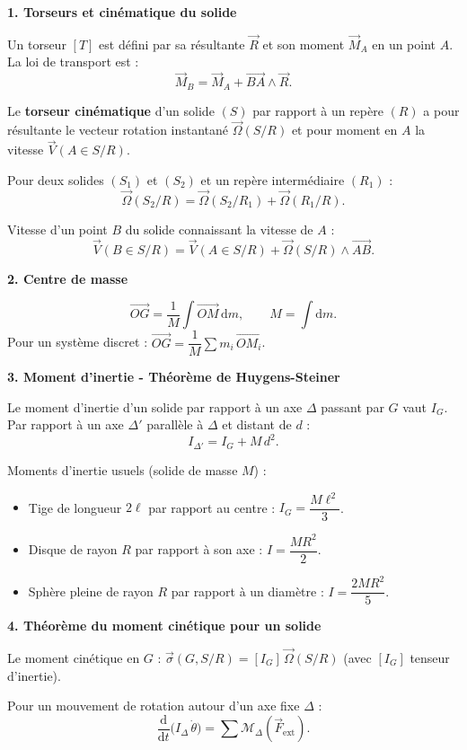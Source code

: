 \documentclass[12pt,a4paper]{article}
\begin{document}
\begin{boiteresume}
\textbf{1. Torseurs et cinématique du solide}

Un torseur $[T]$ est défini par sa résultante $\vec{R}$ et son moment $\vec{M}_A$ en un point $A$. La loi de transport est :
\[
\vec{M}_B = \vec{M}_A + \overrightarrow{BA} \wedge \vec{R}.
\]

Le \textbf{torseur cinématique} d'un solide $(S)$ par rapport à un repère $(R)$ a pour résultante le vecteur rotation instantané $\vec{\Omega}(S/R)$ et pour moment en $A$ la vitesse $\vec{V}(A \in S/R)$.

Pour deux solides $(S_1)$ et $(S_2)$ et un repère intermédiaire $(R_1)$ :
\[
\vec{\Omega}(S_2/R) = \vec{\Omega}(S_2/R_1) + \vec{\Omega}(R_1/R).
\]

Vitesse d'un point $B$ du solide connaissant la vitesse de $A$ :
\[
\vec{V}(B \in S/R) = \vec{V}(A \in S/R) + \vec{\Omega}(S/R) \wedge \overrightarrow{AB}.
\]

\medskip
\textbf{2. Centre de masse}

\[
\overrightarrow{OG} = \frac{1}{M}\int \overrightarrow{OM}\,\mathrm{d}m, \qquad M = \int \mathrm{d}m.
\]
Pour un système discret : $\overrightarrow{OG} = \dfrac{1}{M}\sum m_i\,\overrightarrow{OM_i}$.

\medskip
\textbf{3. Moment d'inertie - Théorème de Huygens-Steiner}

Le moment d'inertie d'un solide par rapport à un axe $\Delta$ passant par $G$ vaut $I_G$. Par rapport à un axe $\Delta'$ parallèle à $\Delta$ et distant de $d$ :
\[
I_{\Delta'} = I_G + M\,d^2.
\]

Moments d'inertie usuels (solide de masse $M$) :
\begin{itemize}
  \item Tige de longueur $2\ell$ par rapport au centre : $I_G = \dfrac{M\ell^2}{3}$.
  \item Disque de rayon $R$ par rapport à son axe : $I = \dfrac{MR^2}{2}$.
  \item Sphère pleine de rayon $R$ par rapport à un diamètre : $I = \dfrac{2MR^2}{5}$.
\end{itemize}

\medskip
\textbf{4. Théorème du moment cinétique pour un solide}

Le moment cinétique en $G$ : $\vec{\sigma}(G, S/R) = [I_G]\,\vec{\Omega}(S/R)$ (avec $[I_G]$ tenseur d'inertie).

Pour un mouvement de rotation autour d'un axe fixe $\Delta$ :
\[
\frac{\mathrm{d}}{\mathrm{d}t}\bigl(I_\Delta\,\dot{\theta}\bigr) = \sum \mathcal{M}_\Delta(\vec{F}_{\mathrm{ext}}).
\]


\end{boiteresume}
\end{document}
